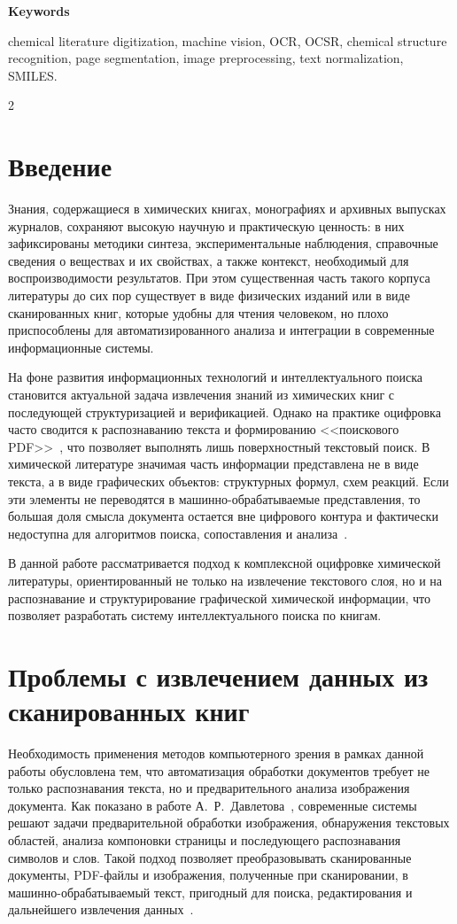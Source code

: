 \documentclass[11pt]{article}
\newcommand{\enKeywords}[1]{\noindent\textbf{Keywords}\par\noindent #1\par\vspace{0.75em}}
\begin{document}
\enKeywords{chemical literature digitization, machine vision, OCR, OCSR, chemical structure recognition, page segmentation, image preprocessing, text normalization, SMILES.
 } 
\begin{multicols}{2}	

\section*{Введение}
Знания, содержащиеся в химических книгах, монографиях и архивных выпусках журналов, сохраняют высокую научную и практическую ценность: в них зафиксированы методики синтеза, экспериментальные наблюдения, справочные сведения о веществах и их свойствах, а также контекст, необходимый для воспроизводимости результатов. При этом существенная часть такого корпуса литературы до сих пор существует в виде физических изданий или в виде сканированных книг, которые удобны для чтения человеком, но плохо приспособлены для автоматизированного анализа и интеграции в современные информационные системы.

На фоне развития информационных технологий и интеллектуального поиска становится актуальной задача извлечения знаний из химических книг с последующей структуризацией и верификацией. Однако на практике оцифровка часто сводится к распознаванию текста и формированию <<поискового PDF>>~\cite{refDavletov}, что позволяет выполнять лишь поверхностный текстовый поиск. В химической литературе значимая часть информации представлена не в виде текста, а в виде графических объектов: структурных формул, схем реакций. Если эти элементы не переводятся в машинно-обрабатываемые представления, то большая доля смысла документа остается вне цифрового контура и фактически недоступна для алгоритмов поиска, сопоставления и анализа~\cite{refKuchuganov}.

В данной работе рассматривается подход к комплексной оцифровке химической литературы, ориентированный не только на извлечение текстового слоя, но и на распознавание и структурирование графической химической информации, что позволяет разработать систему интеллектуального поиска по книгам.  


\section{Проблемы с извлечением данных из сканированных книг}
Необходимость применения методов компьютерного зрения в рамках данной работы обусловлена тем, что автоматизация обработки документов требует не только распознавания текста, но и предварительного анализа изображения документа. Как показано в работе А.~Р.~Давлетова~\cite{refDavletov}, современные системы решают задачи предварительной обработки изображения, обнаружения текстовых областей, анализа компоновки страницы и последующего распознавания символов и слов. Такой подход позволяет преобразовывать сканированные документы, PDF-файлы и изображения, полученные при сканировании, в машинно-обрабатываемый текст, пригодный для поиска, редактирования и дальнейшего извлечения данных~\cite{refDavletov}. 


\end{multicols}
\end{document}
